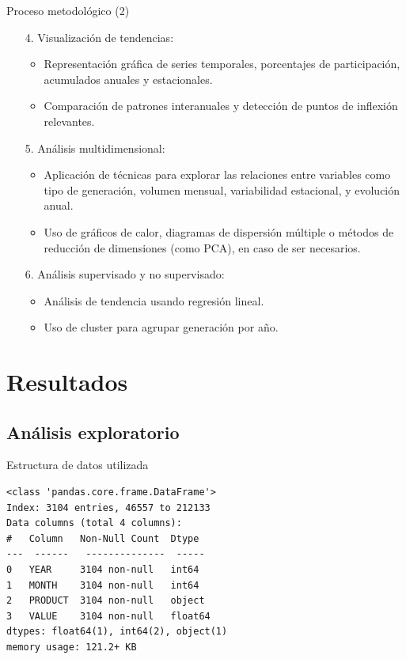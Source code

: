 \documentclass[10pt]{beamer}
\begin{document}
	\begin{frame}[fragile]{Proceso metodol\'ogico (2)}
		\begin{enumerate}			
			\item[4.] Visualización de tendencias:
			\begin{itemize}
				\item Representación gráfica de series temporales, porcentajes de participación, acumulados anuales y estacionales.		
				\item Comparación de patrones interanuales y detección de puntos de inflexión relevantes.
			\end{itemize}
			\item[5.] Análisis multidimensional:
			\begin{itemize}
				\item Aplicación de técnicas para explorar las relaciones entre variables como tipo de generación, volumen mensual, variabilidad estacional, y evolución anual.		
				\item Uso de gráficos de calor, diagramas de dispersión múltiple o métodos de reducción de dimensiones (como PCA), en caso de ser necesarios.
			\end{itemize}	
			\item[6.] An\'alisis supervisado y no supervisado:
			\begin{itemize}
				\item An\'alisis de tendencia usando regresi\'on lineal.		
				\item Uso de cluster para agrupar generaci\'on por a\~no.
			\end{itemize}	
		\end{enumerate}
	\end{frame}
	
	
\section[Resultados]{Resultados}
	
\subsection{Análisis exploratorio}
	
\begin{frame}[fragile]{Estructura de datos utilizada}
\begin{verbatim}
<class 'pandas.core.frame.DataFrame'>
Index: 3104 entries, 46557 to 212133
Data columns (total 4 columns):
#   Column   Non-Null Count  Dtype  
---  ------   --------------  -----  
0   YEAR     3104 non-null   int64  
1   MONTH    3104 non-null   int64  
2   PRODUCT  3104 non-null   object 
3   VALUE    3104 non-null   float64
dtypes: float64(1), int64(2), object(1)
memory usage: 121.2+ KB
\end{verbatim}
\end{frame}
		
\end{document}
